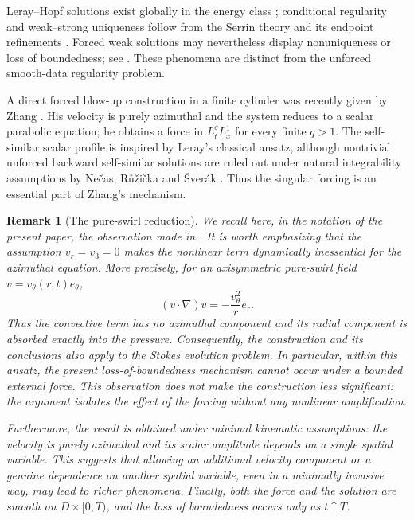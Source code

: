 \documentclass[10pt]{amsart}
\newtheorem{remark}[theorem]{Remark}
\theoremstyle{definition}
\begin{document}
Leray--Hopf solutions exist globally in the energy class
\cite{Leray1934,Hopf1951,Ladyzhenskaya1969,Sohr2001}; conditional regularity
and weak--strong uniqueness follow from the Serrin theory and its endpoint
refinements \cite{Serrin1963,EscauriazaSereginSverak2003,FarwigSohrVarnhorn2012}.
Forced weak solutions may nevertheless display nonuniqueness or loss of
boundedness; see \cite{ABC2022,GaldiGazzola2026}.  These phenomena are distinct
from the unforced smooth-data regularity problem.

A direct forced blow-up construction in a finite cylinder was recently given by
Zhang \cite{Zhang2025}.  His velocity is purely azimuthal and the system reduces
to a scalar parabolic equation; he obtains a force in $L^q_tL^1_x$ for every
finite $q>1$.  The self-similar scalar profile is inspired by Leray's classical
ansatz, although nontrivial unforced backward self-similar solutions are ruled out
under natural integrability assumptions by Ne\v{c}as, R\r{u}\v{z}i\v{c}ka and
\v{S}ver\'ak \cite{NecasRuzickaSverak1996}.  Thus the singular forcing is an
essential part of Zhang's mechanism.

\begin{remark}[The pure-swirl reduction]
\label{rem:old-remark}
We recall here, in the notation of the present paper, the observation made in
\cite[Remark~2.1]{BDVY2024}.  It is worth emphasizing that the assumption $v_r=v_3=0$ makes the nonlinear
term dynamically inessential for the azimuthal equation.  More precisely, for
an axisymmetric pure-swirl field $v=v_\theta(r,t)e_\theta$,
\[
    (v\cdot\nabla)v=-\frac{v_\theta^2}{r}e_r.
\]
Thus the convective term has no azimuthal component and its radial component is
absorbed exactly into the pressure.  Consequently, the construction and its
conclusions also apply to the Stokes evolution problem.  In particular, within
this ansatz, the present loss-of-boundedness mechanism cannot occur under a
bounded external force.  This observation does not make the construction less
significant: the argument isolates the effect of the forcing without any
nonlinear amplification.

Furthermore, the result is obtained under minimal kinematic assumptions: the
velocity is purely azimuthal and its scalar amplitude depends on a single
spatial variable.  This suggests that allowing an additional velocity component
or a genuine dependence on another spatial variable, even in a minimally
invasive way, may lead to richer phenomena.  Finally, both the force and the
solution are smooth on $D\times[0,T)$, and the loss of boundedness occurs only
as $t\uparrow T$.
\end{remark}
\end{document}
